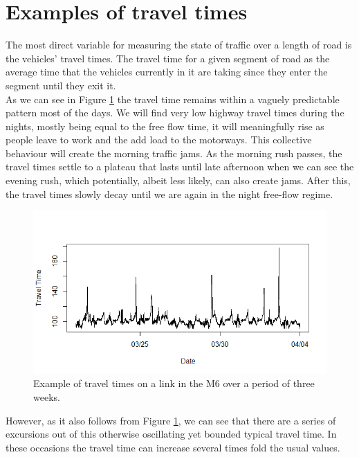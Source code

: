 \documentclass[conference]{IEEEtran}
\begin{document}
\section{Examples of travel times} 
The most direct variable for measuring the state of traffic over a length of road is the vehicles' travel times. The travel time for a given segment of road as the average time that the vehicles currently in it are taking since they enter the segment until they exit it.\\

As we can see in Figure \ref{fig:travel_time_example} the travel time remains within a vaguely predictable pattern most of the days. We will find very low highway travel times during the nights, mostly being equal to the free flow time, it will meaningfully rise as people leave to work and the add load to the motorways. This collective behaviour will create the morning traffic jams. As the morning rush passes, the travel times settle to a plateau that lasts until late afternoon when we can see the evening rush, which potentially, albeit less likely, can also create jams. After this, the travel times slowly decay until we are again in the night free-flow regime.

\begin{figure}[htbp]
	\centerline{\includegraphics[width=\linewidth]{./images/Traveltime_example.png}}
	\caption{Example of travel times on a link in the M6 over a period of three weeks.}
	\label{fig:travel_time_example}
\end{figure}

However, as it also follows from Figure \ref{fig:travel_time_example}, we can see that there are a series of excursions out of this otherwise oscillating yet bounded typical travel time. In these occasions the travel time can increase several times fold the usual values. 
\end{document}
